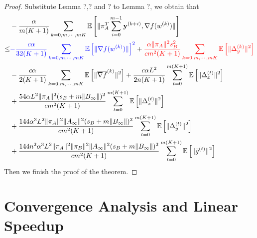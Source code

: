 \documentclass{article}
\newcommand{\vy}{{\mathbf{y}}}
\newcommand{\EE}[1]{\mathbb{E}\left[#1\right]}
\newcommand{\norm}[1]{\| #1 \|}
\begin{document}
\begin{proof}
  Substitute Lemma ?,? and ? to Lemma ?, we obtain that
  \begin{align*}
    &-\frac{\alpha}{m(K+1)}\sum_{k=0,m,\cdots,mK}\EE{\norm{\pi_A^T\sum_{i=0}^{m-1}\vy^{(k+i)},\nabla f(w^{(k)}) }}\\
    \leq& \textcolor{blue}{-\frac{c\alpha}{32(K+1)}\sum_{k=0,m,\cdots,mK}\EE{\norm{\nabla f(w^{(k)})}}^2}+\textcolor{red}{\frac{\alpha\norm{\pi_A}^2s_B^2}{cm^2(K+1)}\sum_{k=0,m,\cdots,mK}\EE{\norm{\Delta_y^{(k)}}^2}}\\&-\frac{c\alpha }{2(K+1)}\sum_{k=0,m,\cdots,mK}\EE{\norm{\overline{\nabla f}^{(k)}}^2}+\frac{c\alpha L^2}{2n(K+1)}\sum_{t=0}^{m(K+1)}\EE{\norm{\Delta_x^{(t)}}^2}\\&+\frac{54\alpha L^2\norm{\pi_A}^2(s_B+m\norm{B_{\infty}})^2}{cm^2(K+1)}\sum_{t=0}^{m(K+1)}\EE{\norm{\Delta_x^{(t)}}^2}\\&+\frac{144\alpha^3L^2\norm{\pi_A}^2\norm{A_{\infty}}^2(s_B+m\norm{B_{\infty}})^2}{cm^2(K+1)}\sum_{t=0}^{m(K+1)}\EE{\norm{\Delta_y^{(t)}}^2}
    \\&+\frac{144n^2\alpha^3L^2\norm{\pi_A}^2\norm{\pi_B}^2\norm{A_{\infty}}^2(s_B+m\norm{B_{\infty}})^2}{cm^2(K+1)}\sum_{t=0}^{m(K+1)}\EE{\norm{\bar{g}^{(t)}}^2}
  \end{align*}
  Then we finish the proof of the theorem.
\end{proof}

\section{Convergence Analysis and Linear Speedup}
\end{document}
